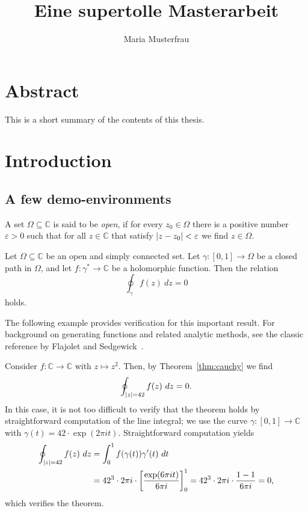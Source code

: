 \documentclass[11pt, twoside, withdegree]{bhthesis}
\title{Eine supertolle Masterarbeit}
\author{Maria Musterfrau}
\DeclarePairedDelimiter{\abs}{\lvert}{\rvert}
\begin{document}
\maketitle

\chapter*{Abstract}
This is a short summary of the contents of this thesis.

\tableofcontents

\chapter{Introduction}\label{chap:intro}

\section{A few demo-environments}

\begin{definition}
  A set $\Omega\subseteq\mathbb{C}$ is said to be \emph{open}, if for every
  $z_{0}\in\Omega$ there is a positive number $\varepsilon > 0$ such
  that for all $z\in\mathbb{C}$ that satisfy $\abs{z - z_{0}} <
  \varepsilon$ we find $z\in\Omega$.
\end{definition}

\begin{theorem}\label{thm:cauchy}
  Let $\Omega\subseteq\mathbb{C}$ be an open and simply connected
  set. Let $\gamma:[0,1]\to \Omega$ be a closed path in $\Omega$, and
  let $f\colon\gamma^{*} \to \mathbb{C}$ be a holomorphic function.
  Then the relation
  \begin{equation}\label{eq:cauchy-integral}
    \oint_{\gamma} f(z)~dz = 0
  \end{equation}
  holds.
\end{theorem}

The following example provides verification for this important result. For
background on generating functions and related analytic methods, see the classic
reference by Flajolet and Sedgewick~\cite{flajolet_sedgewick_2009}.

\begin{example}
  Consider $f\colon \mathbb{C} \to \mathbb{C}$ with $z\mapsto
  z^{2}$. Then, by Theorem~\ref{thm:cauchy} we find
  \[ \oint_{\abs{z} = 42} f(z)~dz = 0.  \]
  In this case, it is not too difficult to verify that the theorem
  holds by straightforward computation of the line integral; we use
  the curve $\gamma\colon [0,1]\to \mathbb{C}$ with $\gamma(t) =
  42\cdot\exp(2\pi i t)$. Straightforward computation yields
  \begin{align*}
    \oint_{\abs{z} = 42} f(z)~dz
    &= \int_{0}^{1} f(\gamma(t)) \gamma'(t)~dt\\
    &= 42^{3}\cdot 2\pi i \cdot \biggl[\frac{\exp(6 \pi i t)}{6 \pi
      i}\biggr]_{0}^{1} = 42^{3}\cdot 2\pi i\cdot \frac{1 - 1}{6\pi
      i} = 0,
  \end{align*}
  which verifies the theorem.
\end{example}
\end{document}
